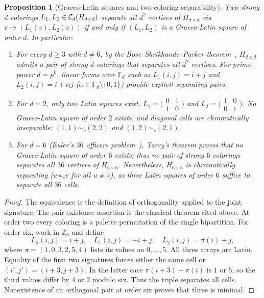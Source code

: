 \documentclass[aps,pra,reprint,superscriptaddress,longbibliography,nofootinbib,floatfix,10pt]{revtex4-2}
\newtheorem{proposition}[theorem]{Proposition}
\theoremstyle{definition}\newtheorem{definition}[theorem]{Definition}
\theoremstyle{remark}\newtheorem{remark}[theorem]{Remark}
\newcommand{\F}{\mathbb F}\newcommand{\Z}{\mathbb Z}\newcommand{\PP}{\mathbb P}
\begin{document}
\begin{proposition}[Graeco-Latin squares and two-coloring separability]\label{prop:graeco-sep}
Two strong $d$-colorings $L_1,L_2\in\mathcal C_d(H_{d\times d})$ separate all $d^2$ vertices of $H_{d\times d}$ via $v\mapsto(L_1(v),L_2(v))$ if and only if $(L_1,L_2)$ is a Graeco-Latin square of order $d$. In particular:
\begin{enumerate}
\item For every $d\ge 3$ with $d\neq 6$, by the Bose--Shrikhande--Parker theorem~\cite{bose1960further}, $H_{d\times d}$ admits a pair of strong $d$-colorings that separates all $d^2$ vertices. For prime-power $d=p^k$, linear forms over $\F_d$ such as $L_1(i,j)=i+j$ and $L_2(i,j)=i+\alpha j$ ($\alpha\in\F_d\setminus\{0,1\}$) provide explicit separating pairs.
\item For $d=2$, only two Latin squares exist, $L_1=\bigl(\begin{smallmatrix}0&1\\1&0\end{smallmatrix}\bigr)$ and $L_2=\bigl(\begin{smallmatrix}1&0\\0&1\end{smallmatrix}\bigr)$. No Graeco-Latin square of order $2$ exists, and diagonal cells are chromatically inseparable: $(1,1)\sim_c(2,2)$ and $(1,2)\sim_c(2,1)$.
\item For $d=6$ (Euler's $36$ officers problem~\cite{bose1960further}), Tarry's theorem proves that no Graeco-Latin square of order $6$ exists; thus \emph{no pair} of strong $6$-colorings separates all $36$ vertices of $H_{6\times 6}$. Nevertheless, $H_{6\times 6}$ is chromatically separating ($u\not\sim_c v$ for all $u\neq v$), as three Latin squares of order $6$ suffice to separate all $36$ cells.
\end{enumerate}
\end{proposition}


\begin{proof}
The equivalence is the definition of orthogonality applied to the joint signature. The pair-existence assertion is the classical theorem cited above. At order two every coloring is a palette permutation of the single bipartition. For order six, work in $\Z_6$ and define
\[
L_0(i,j)=i+j,\quad L_1(i,j)=-i+j,\quad L_2(i,j)=\pi(i)+j,
\]
where $\pi=(1,0,3,2,5,4)$ lists its values on $0,\ldots,5$. All three arrays are Latin. Equality of the first two signatures forces either the same cell or $(i',j')=(i+3,j+3)$. In the latter case $\pi(i+3)-\pi(i)$ is $1$ or $5$, so the third values differ by $4$ or $2$ modulo six. Thus the triple separates all cells. Nonexistence of an orthogonal pair at order six proves that three is minimal.
\end{proof}
\end{document}
